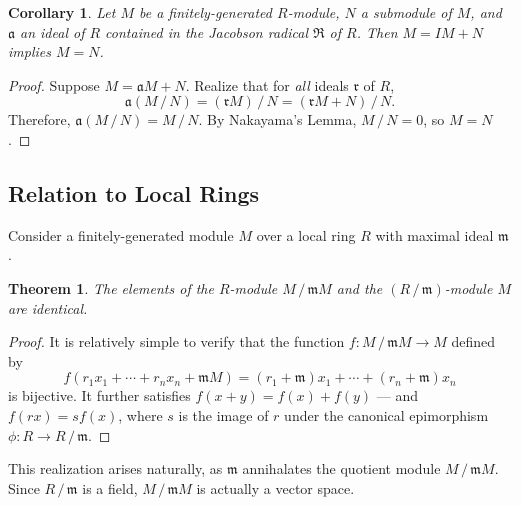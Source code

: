 \documentclass[11pt]{article}
\newtheorem{theorem}{Theorem}
\newtheorem{corollary}{Corollary}
\begin{document}
\begin{adjustwidth}{0.5cm}{}
	\begin{corollary}
		Let $M$ be a finitely-generated $R$-module, $N$ a submodule of $M$, and $\mathfrak{a}$ an ideal of $R$ contained in the Jacobson radical $\mathfrak{R}$ of $R$. Then $M = IM + N$ implies $M = N$.
	\end{corollary}
	\begin{proof}
		Suppose $M = \mathfrak{a} M + N$. Realize that for \textit{all} ideals $\mathfrak{r}$ of $R$,
		\[
			\mathfrak{a}(M \,/\, N) = (\mathfrak{r}M) \,/\, N = (\mathfrak{r}M + N) \,/\, N.
		\]
		Therefore, $\mathfrak{a}(M \,/\, N) = M \,/\, N$. By Nakayama's Lemma, $M \,/\, N = 0$, so $M = N$.
	\end{proof}
\end{adjustwidth}


\subsection{Relation to Local Rings}

Consider a finitely-generated module $M$ over a local ring $R$ with maximal ideal $\mathfrak{m}$. 

\begin{adjustwidth}{0.5cm}{}
	\begin{theorem}
		The elements of the $R$-module $M \,/\, \mathfrak{m} M$ and the $(R \,/\, \mathfrak{m})$-module $M$ are identical.
	\end{theorem}
	\begin{proof}
		It is relatively simple to verify that the function $f : M \,/\, \mathfrak{m} M \to M$ defined by
		\[
			f(r_{1} x_{1} + \cdots + r_{n} x_{n} + \mathfrak{m}M) = (r_{1} + \mathfrak{m})x_{1} + \cdots + (r_{n} + \mathfrak{m})x_{n}
		\]
		is bijective. It further satisfies $f(x + y) = f(x) + f(y)$ --- and $f(rx) = s f(x)$, where $s$ is the image of $r$ under the canonical epimorphism $\phi : R \to R \,/\, \mathfrak{m}$.
	\end{proof}
\end{adjustwidth}

This realization arises naturally, as $\mathfrak{m}$ annihalates the quotient module $M \,/\, \mathfrak{m} M$. Since $R \,/\, \mathfrak{m}$ is a field, $M \,/\, \mathfrak{m} M$ is actually a vector space.
\end{document}
